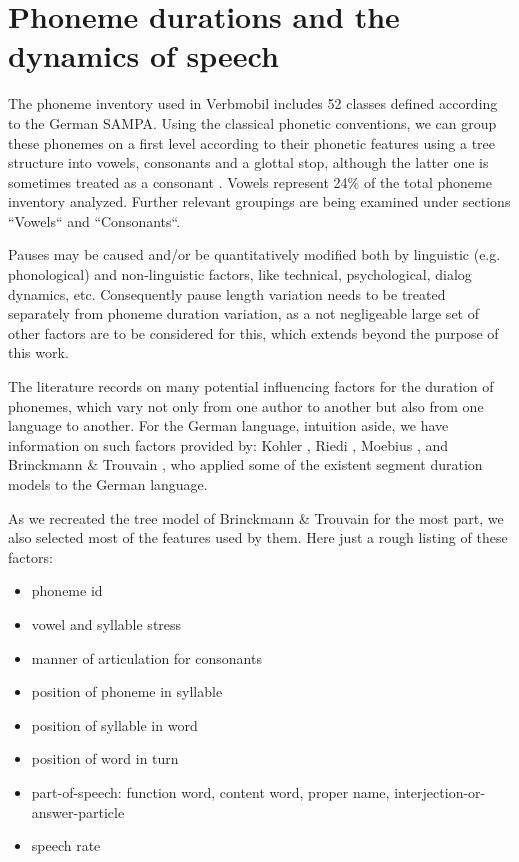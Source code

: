 \documentclass[a4paper]{scrreprt}
\begin{document}
\chapter{Phoneme durations and the dynamics of speech}
The phoneme inventory used in Verbmobil includes 52 classes defined according to the German SAMPA. Using the classical phonetic conventions, we can group these phonemes on a first level according to their phonetic features using a tree structure into vowels, consonants and a glottal stop, although the latter one is sometimes treated as a consonant \cite{Kohler1995}. Vowels represent 24\% of the total phoneme inventory analyzed. Further relevant groupings are being examined under sections ``Vowels`` and ``Consonants``.

Pauses may be caused and/or be quantitatively modified both by linguistic (e.g. phonological) and non-linguistic factors, like technical, psychological, dialog dynamics, etc. Consequently pause length variation needs to be treated separately from phoneme duration variation, as a not negligeable large set of other factors are to be considered for this, which extends beyond the purpose of this work.

The literature records on many potential influencing factors for the duration of phonemes, which vary not only from one author to another but also from one language to another. For the German language, intuition aside, we have information on such factors provided by: Kohler \cite{Kohler1992}, Riedi \cite{Riedi1995}, Moebius \cite{Moebius1996}, and Brinckmann \& Trouvain \cite{Brinckmann_2003}, who applied some of the existent segment duration models to the German language.

As we recreated the tree model of Brinckmann \& Trouvain \cite{Brinckmann_2003} for the most part, we also selected most of the features used by them. Here just a rough listing of these factors:

\begin{itemize}
	\item phoneme id
	\item vowel and syllable stress
	\item manner of articulation for consonants
	\item position of phoneme in syllable
	\item position of syllable in word
	\item position of word in turn
	\item part-of-speech: function word, content word, proper name, interjection-or-answer-particle
	\item speech rate
\end{itemize}
\end{document}
